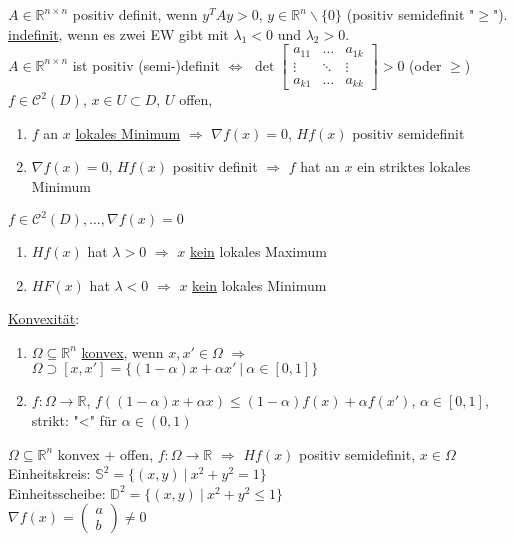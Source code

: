 \documentclass[a4paper]{article}
\newcommand{\ul}{\underline}
\begin{document}
$A\in\mathbb{R}^{n\times n}$ positiv definit, wenn $y^TAy>0$, $y\in\mathbb{R}^n\backslash\{0\}$ (positiv semidefinit "$\geq$").\\
\ul{indefinit}, wenn es zwei EW gibt mit $\lambda_1<0$ und $\lambda_2>0$.\\
$A\in\mathbb{R}^{n\times n}$ ist positiv (semi-)definit $\Leftrightarrow$ $\det\begin{bmatrix}
a_{11} & \hdots & a_{1k}\\
\vdots & \ddots & \vdots\\
a_{k1} & \hdots & a_{kk}
\end{bmatrix}>0$ (oder $\geq$)\\
$f\in\mathcal{C}^2(D)$, $x\in U\subset D$, $U$ offen,
\begin{enumerate}[1)]
	\item $f$ an $x$ \ul{lokales Minimum} $\Rightarrow$ $\nabla f(x)=0$, $Hf(x)$ positiv semidefinit
	\item $\nabla f(x)=0$, $Hf(x)$ positiv definit $\Rightarrow$ $f$ hat an $x$ ein striktes lokales Minimum
\end{enumerate}
$f\in\mathcal{C}^2(D),\dots,\nabla f(x)=0$
\begin{enumerate}
	\item $Hf(x)$ hat $\lambda>0$ $\Rightarrow$ $x$ \ul{kein} lokales Maximum
	\item $HF(x)$ hat $\lambda<0$ $\Rightarrow$ $x$ \ul{kein} lokales Minimum
\end{enumerate}
\ul{Konvexität}:
\begin{enumerate}
	\item $\Omega\subseteq\mathbb{R}^n$ \ul{konvex}, wenn $x,x'\in\Omega$ $\Rightarrow$ $\Omega\supset\left[x,x'\right]=\{(1-\alpha)x+\alpha x'\ \vert\ \alpha\in\left[0,1\right]\}$
	\item $f:\Omega\rightarrow\mathbb{R}$, $f((1-\alpha)x+\alpha x)\leq (1-\alpha)f(x)+\alpha f(x')$, $\alpha\in\left[0,1\right]$, strikt: "<" für $\alpha\in(0,1)$
\end{enumerate}
$\Omega\subseteq\mathbb{R}^n$ konvex + offen, $f:\Omega\rightarrow\mathbb{R}$ $\Rightarrow$ $Hf(x)$ positiv semidefinit, $x\in\Omega$\\
Einheitskreis: $\mathbb{S}^2=\{(x,y)\ \vert\ x^2+y^2=1\}$\\
Einheitsscheibe: $\mathbb{D}^2=\{(x,y)\ \vert\ x^2+y^2\leq1\}$\\
$\nabla f(x)=\begin{pmatrix}
a\\b
\end{pmatrix}\neq0$\\
\end{document}

